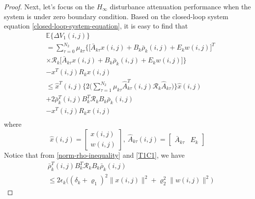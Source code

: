 \documentclass[conference]{IEEEtran}
\begin{document}
\begin{proof}
	Next, let's focus on the $H_{\infty}$  disturbance attenuation performance when the system is under zero boundary condition. Based on the closed-loop system equation \eqref{closed-loop-system-equation}, it is easy to find that
	\begin{equation}\label{DETAV1}
	\begin{split}
	&\mathbb{E}\{\varDelta V_{1}(i,j) \}\\
	&=  \sum_{\tau =0}^{N_{2}}\mu_{k\tau }\Big\{\big[\bar{A}_{k\tau }x(i,j)+B_{k}\bar{\rho}_{k}(i,j)+E_{k}w(i,j)\big]^{T}\\
	&\times \mathcal{R}_{k}\big[\bar{A}_{k\tau }x(i,j)+B_{k}\bar{\rho}_{k}(i,j)+E_{k}w(i,j)\big]\Big\}\\
	&- x^{T}(i,j)R_{k}x(i,j) \\
	&\leq \hat{x}^{T}(i,j) \Big\{2\big(\sum_{\tau =1}^{N_{2}}\mu_{k\tau }\hat{A}^{T}_{k\tau }(i,j)\mathcal{R}_{k}\hat{A}_{k\tau }\big)\Big\}\hat{x}(i,j)\\ &+2\bar{\rho}^{T}_{k}(i,j)B^{T}_{k}\mathcal{R}_{k}B_{k}\bar{\rho}_{k}(i,j) \\
	&-  x^{T}(i,j)R_{k}x(i,j)\\
	\end{split}
	\end{equation}
	where
	\begin{equation*}
		\hat{x}(i,j)=\begin{bmatrix}
		x(i,j)\\ w(i,j)
		\end{bmatrix},\ \hat{A}_{k\tau }(i,j)=\begin{bmatrix}
		\bar{A}_{k\tau }&E_{k}
		\end{bmatrix}
	\end{equation*}
	Notice that from \eqref{norm-rho-inequality} and \eqref{T1C1}, we have
	\begin{equation}\label{invRho}
		\begin{split}
		 	&\bar{\rho}^{T}_{k}(i,j)B^{T}_{k}\mathcal{R}_{k}B_{k}\bar{\rho}_{k}(i,j)\\
		 	&\leq 2\epsilon_{k}\big((\delta_{k}+\varrho_{1})^{2}\|x(i,j)\|^{2}+\varrho_{2}^{2}\|w(i,j)\|^{2} \big)
		\end{split}

\end{equation}
\end{proof}
\end{document}
